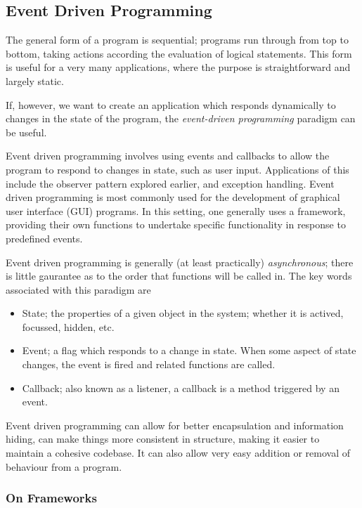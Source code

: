 \documentclass[12pt]{report}
\begin{document}
\begin{flushleft}
\subsection*{Event Driven Programming}

The general form of a program is sequential; programs run through from top to
bottom, taking actions according the evaluation of logical statements. This
form is useful for a very many applications, where the purpose is
straightforward and largely static. \par
If, however, we want to create an application which responds dynamically to
changes in the state of the program, the \textit{event-driven programming}
paradigm can be useful. \par
Event driven programming involves using events and callbacks to allow the
program to respond to changes in state, such as user input. Applications of
this include the observer pattern explored earlier, and exception handling.
Event driven programming is most commonly used for the development of graphical
user interface (GUI) programs. In this setting, one generally uses a framework,
providing their own functions to undertake specific functionality in response
to predefined events. \par
Event driven programming is generally (at least practically)
\textit{asynchronous}; there is little gaurantee as to the order that functions
will be called in. The key words associated with this paradigm are

\begin{itemize}
    \item State; the properties of a given object in the system; whether it is
        actived, focussed, hidden, etc.
    \item Event; a flag which responds to a change in state. When some aspect
        of state changes, the event is fired and related functions are called.
    \item Callback; also known as a listener, a callback is a method
        triggered by an event.
\end{itemize}

Event driven programming can allow for better encapsulation and information
hiding, can make things more consistent in structure, making it easier to
maintain a cohesive codebase. It can also allow very easy addition or removal
of behaviour from a program.

\subsubsection*{On Frameworks}


\end{flushleft}
\end{document}
